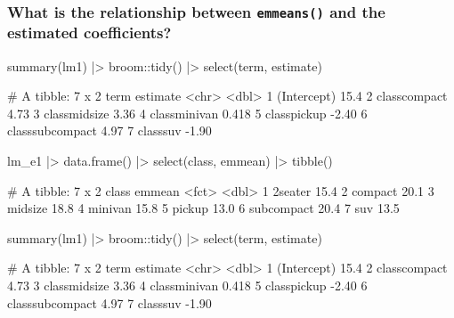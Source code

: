 \documentclass[a4paper]{article}\usepackage[]{graphicx}\usepackage[]{xcolor}
\begin{document}
\subsubsection{What is the relationship between \lstinline|emmeans()| and the estimated coefficients?}
\begin{minipage}[t]{0.49\textwidth}
\begin{Schunk}
\begin{Sinput}
summary(lm1) |> 
  broom::tidy() |> 
  select(term, estimate)
\end{Sinput}
\begin{Soutput}
# A tibble: 7 x 2
  term            estimate
  <chr>              <dbl>
1 (Intercept)       15.4  
2 classcompact       4.73 
3 classmidsize       3.36 
4 classminivan       0.418
5 classpickup       -2.40 
6 classsubcompact    4.97 
7 classsuv          -1.90 
\end{Soutput}
\end{Schunk}
\end{minipage}
\hspace{0.02\textwidth}
\begin{minipage}[t]{0.49\textwidth}
\begin{Schunk}
\begin{Sinput}
lm_e1 |> data.frame() |> 
  select(class, emmean) |>
  tibble()
\end{Sinput}
\begin{Soutput}
# A tibble: 7 x 2
  class      emmean
  <fct>       <dbl>
1 2seater      15.4
2 compact      20.1
3 midsize      18.8
4 minivan      15.8
5 pickup       13.0
6 subcompact   20.4
7 suv          13.5
\end{Soutput}
\end{Schunk}
\end{minipage}
\begin{minipage}[t]{0.49\textwidth}
\begin{Schunk}
\begin{Sinput}
summary(lm1) |> 
  broom::tidy() |> 
  select(term, estimate)
\end{Sinput}
\begin{Soutput}
# A tibble: 7 x 2
  term            estimate
  <chr>              <dbl>
1 (Intercept)       15.4  
2 classcompact       4.73 
3 classmidsize       3.36 
4 classminivan       0.418
5 classpickup       -2.40 
6 classsubcompact    4.97 
7 classsuv          -1.90 
\end{Soutput}
\end{Schunk}
\end{minipage}
\end{document}
